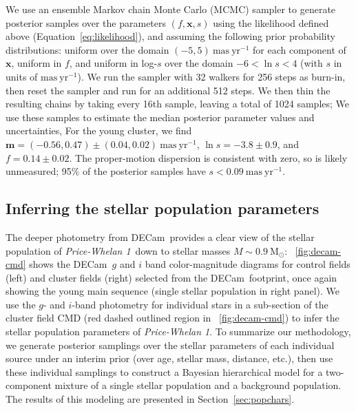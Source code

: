 \documentclass[twocolumn]{aastex62}
\newcommand{\decam}{DECam}
\newcommand{\bs}[1]{\boldsymbol{#1}}
\newcommand{\sectionname}{Section}
\newcommand{\equationname}{Equation}
\newcommand{\msun}{\textrm{M}_\odot}
\newcommand{\masyr}{\ensuremath{\textrm{mas}~\textrm{yr}^{-1}}}
\newcommand{\clustername}{\textsl{Price-Whelan 1}}
\begin{document}
We use an ensemble Markov chain Monte Carlo (MCMC) sampler \citep[\texttt{emcee};][]{Goodman:2010, emcee} to generate posterior samples over the parameters $(f, \bs{x}, s)$ using the likelihood defined above (\equationname~\ref{eq:likelihood}), and assuming the following prior probability distributions: uniform over the domain $(-5, 5)~\masyr$ for each component of $\bs{x}$, uniform in $f$, and uniform in log-$s$ over the domain $-6 < \ln s < 4$ (with $s$ in units of \masyr).
We run the sampler with 32 walkers for 256 steps as burn-in, then reset the sampler and run for an additional 512 steps.
We then thin the resulting chains by taking every 16th sample, leaving a total of 1024 samples; We use these samples to estimate the median posterior parameter values and uncertainties,
For the young cluster, we find $\bs{m} = (-0.56,  0.47) \pm (0.04, 0.02)~\masyr$, $\ln s = -3.8 \pm 0.9$, and $f = 0.14 \pm 0.02$.
The proper-motion dispersion is consistent with zero, so is likely unmeasured; 95\% of the posterior samples have $s < 0.09~\masyr$.


\subsection{Inferring the stellar population parameters}
\label{sec:popmodel}

The deeper photometry from \decam\ provides a clear view of the stellar population of \clustername\ down to stellar masses $M \sim 0.9~\msun$:
\figurename~\ref{fig:decam-cmd} shows the \decam\ $g$ and $i$ band color-magnitude diagrams for control fields (left) and cluster fields (right) selected from the \decam\ footprint, once again showing the young main sequence (single stellar population in right panel).
We use the $g$- and $i$-band photometry for individual stars in a sub-section of the cluster field CMD (red dashed outlined region in \figurename~\ref{fig:decam-cmd}) to infer the stellar population parameters of \clustername.
To summarize our methodology, we generate posterior samplings over the stellar parameters of each individual source under an interim prior (over age, stellar mass, distance, etc.), then use these individual samplings to construct a Bayesian hierarchical model for a two-component mixture of a single stellar population and a background population.
The results of this modeling are presented in \sectionname~\ref{sec:popchars}.
\end{document}
